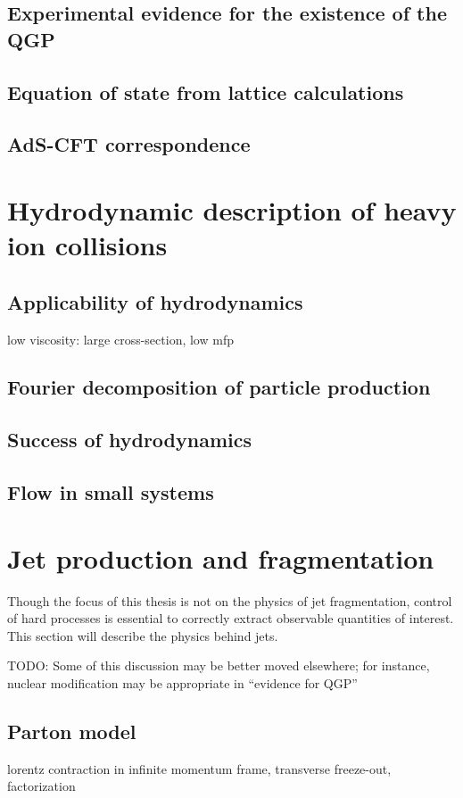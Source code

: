 \subsection{Experimental evidence for the existence of the QGP}
\subsection{Equation of state from lattice calculations}
\subsection{AdS-CFT correspondence}

\section{Hydrodynamic description of heavy ion collisions}
\subsection{Applicability of hydrodynamics}
low viscosity: large cross-section, low mfp
\subsection{Fourier decomposition of particle production}
\subsection{Success of hydrodynamics}
\subsection{Flow in small systems}

\section{Jet production and fragmentation}
Though the focus of this thesis is not on the physics of jet fragmentation, control of hard processes is essential to correctly extract observable quantities of interest.
This section will describe the physics behind jets.

TODO: Some of this discussion may be better moved elsewhere; for instance, nuclear modification may be appropriate in ``evidence for QGP''
\subsection{Parton model}
lorentz contraction in infinite momentum frame, transverse freeze-out, factorization
